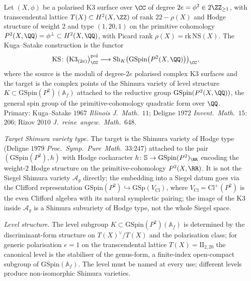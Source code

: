 \begin{theorem}
\label{wn:thm:third-pass-kuga-satake}

Let $(X, \phi)$ be a polarised K3 surface over $\CC$ of degree
$2e = \phi^2 \in 2\ZZ_{\geq 1}$, with transcendental lattice
$T(X) \subset H^2(X, \ZZ)$ of rank $22 - \rho(X)$ and Hodge
structure of weight $2$ and type $(1, 20, 1)$ on the primitive
cohomology $P^2(X, \QQ) = \phi^{\perp} \subset H^2(X, \QQ)$, with
Picard rank $\rho(X) = \mathrm{rk}\,\mathrm{NS}(X)$. The Kuga--Satake
construction is the functor
\[
\mathrm{KS}\colon \bigl(\mathrm{K3}_{(2e)}\bigr)_{\CC}^{\mathrm{pol}}
\longrightarrow \mathrm{Sh}_{K}\bigl(\mathrm{GSpin}\bigl(P^2(X,
\QQ)\bigr)\bigr)_{\CC},
\]
where the source is the moduli of degree-$2e$ polarised complex K3
surfaces and the target is the complex points of the Shimura variety
of level structure $K \subset \mathrm{GSpin}(P^2)(\mathbb{A}_f)$
attached to the reductive group $\mathrm{GSpin}(P^2(X, \QQ))$,
the general spin group of the primitive-cohomology quadratic form
over $\QQ$. Primary: Kuga--Satake $1967$ \emph{Illinois J.~Math.}~$11$;
Deligne $1972$ \emph{Invent.~Math.}~$15$:$206$; Rizov $2010$
\emph{J.~reine~angew.~Math.}~$648$.

\emph{Target Shimura variety type.} The target is the Shimura variety
of Hodge type (Deligne $1979$ \emph{Proc.~Symp.~Pure~Math.}~$33$:$247$)
attached to the pair $(\mathrm{GSpin}(P^2), h)$ with Hodge cocharacter
$h\colon \mathbb{S} \to \mathrm{GSpin}(P^2)_{\RR}$ encoding the weight-$2$
Hodge structure on the primitive-cohomology $P^2(X, \RR)$. It is
not the Siegel Shimura variety $\mathcal{A}_g$ directly; the
embedding into a Siegel datum goes via the Clifford
representation $\mathrm{GSpin}(P^2) \hookrightarrow \mathrm{GSp}(V_{\mathrm{Cl}})$,
where $V_{\mathrm{Cl}} = \mathrm{Cl}^+(P^2)$ is the even Clifford
algebra with its natural symplectic pairing; the image of the K3
inside $\mathcal{A}_g$ is a Shimura subvariety of Hodge type, not
the whole Siegel space.

\emph{Level structure.} The level subgroup
$K \subset \mathrm{GSpin}(P^2)(\mathbb{A}_f)$ is determined by the
discriminant-form structure on $T(X)^\vee/T(X)$ and the polarisation
class; for generic polarisation $e = 1$ on the transcendental lattice
$T(X) = \mathrm{II}_{2, 20}$ the canonical level is the stabiliser of
the genus-form, a finite-index open-compact subgroup of
$\mathrm{GSpin}(\mathbb{A}_f)$. The level must be named at every use;
different levels produce non-isomorphic Shimura varieties.


\end{theorem}
